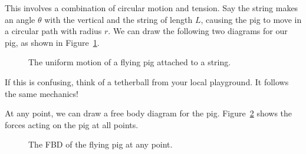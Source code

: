 This involves a combination of circular motion and tension. Say the string makes an angle $\theta$ with the vertical and the string of length $L$, causing the pig to move in a circular path with radius $r$. We can draw the following two diagrams for our pig, as shown in Figure~\ref{fig:flyingpig1}.

\begin{figure}[H]
  \centering
  \begin{center}
  \end{center}
  \caption{The uniform motion of a flying pig attached to a string.}
  \label{fig:flyingpig1}
\end{figure}

If this is confusing, think of a tetherball from your local playground. It follows the same mechanics!

At any point, we can draw a free body diagram for the pig. Figure~\ref{fig:flyingpig2} shows the forces acting on the pig at all points.
\begin{figure}[H]
  \centering
  \caption{The FBD of the flying pig at any point.}
  \label{fig:flyingpig2}
\end{figure}

